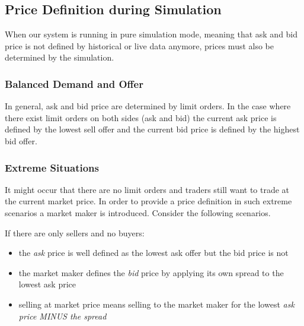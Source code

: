 %
%
%

\subsection{Price Definition during Simulation}

When our system is running in pure simulation mode, meaning that ask and bid price is
not defined by historical or live data anymore, prices must also be determined by the
simulation. 

\subsubsection{Balanced Demand and Offer}
In general, ask and bid price are determined by limit orders. In the case where there
exist limit orders on both sides (ask and bid) the current ask price is defined by the
lowest sell offer and the current bid price is defined by the highest bid offer.

\subsubsection{Extreme Situations}
It might occur that there are no limit orders and traders still want to trade at the 
current market price. In order to provide a price definition in such extreme scenarios
a market maker is introduced. Consider the following scenarios.

%
If there are only sellers and no buyers:
\begin{itemize}
    \item the \textit{ask} price is well defined as the lowest ask offer but the bid price is not
    \item the market maker defines the \textit{bid} price by applying its own spread to the lowest ask price
    \item selling at market price means selling to the market maker for the lowest \textit{ask price MINUS the spread}
\end{itemize}

